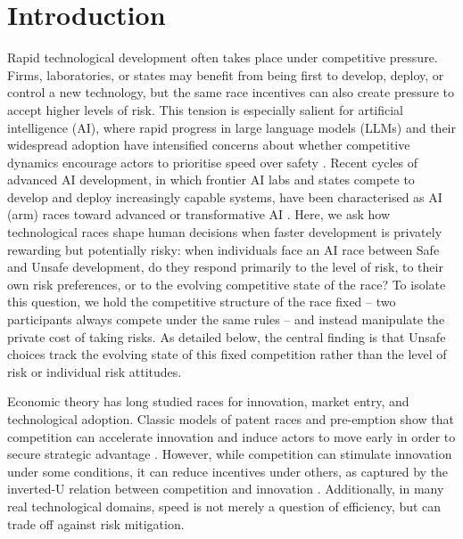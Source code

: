\documentclass[pdflatex,sn-mathphys-ay]{sn-jnl}
\theoremstyle{thmstyleone}
\theoremstyle{thmstyletwo}
\theoremstyle{thmstylethree}
\begin{document}

\maketitle

\section{Introduction}\label{sec:introduction}

Rapid technological development often takes place under competitive pressure. Firms, laboratories, or states may benefit from being first to develop, deploy, or control a new technology, but the same race incentives can also create pressure to accept higher levels of risk. This tension is especially salient for artificial intelligence (AI), where rapid progress in large language models (LLMs) and their widespread adoption have intensified concerns about whether competitive dynamics encourage actors to prioritise speed over safety \citep{hendrycks2023overview,ord2020precipice}. Recent cycles of advanced AI development, in which frontier AI labs and states compete to develop and deploy increasingly capable systems, have been characterised as AI (arm) races toward advanced or transformative AI \citep{bengio2024managing,gruetzemacher2025strategic,muller2026evolvable,saeri2026prioritization}.
Here, we ask how technological races shape human decisions when faster development is privately rewarding but potentially risky: when individuals face an AI race between Safe and Unsafe development, do they respond primarily to the level of risk, to their own risk preferences, or to the evolving competitive state of the race? To isolate this question, we hold the competitive structure of the race fixed -- two participants always compete under the same rules -- and instead manipulate the private cost of taking risks. As detailed below, the central finding is that Unsafe choices track the evolving state of this fixed competition rather than the level of risk or individual risk attitudes.

Economic theory has long studied races for innovation, market entry, and technological adoption. Classic models of patent races and pre-emption show that competition can accelerate innovation and induce actors to move early in order to secure strategic advantage \citep{Loury1979MarketStructureInnovation,FudenbergTirole1985Preemption}. However, while competition can stimulate innovation under some conditions, it can reduce incentives under others, as captured by the inverted-U relation between competition and innovation \citep{AghionEtAl2005CompetitionInnovation}. Additionally, in many real technological domains, speed is not merely a question of efficiency, but can trade off against risk mitigation.
\end{document}

